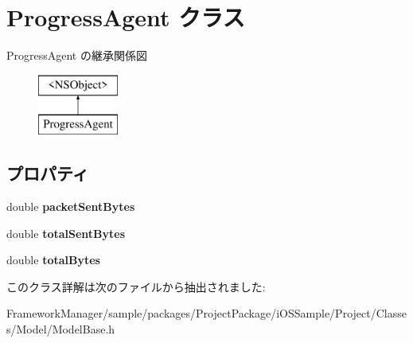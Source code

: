 \hypertarget{interface_progress_agent}{}\section{Progress\+Agent クラス}
\label{interface_progress_agent}
Progress\+Agent の継承関係図\begin{figure}[H]
\begin{center}
\leavevmode
\includegraphics[height=2.000000cm]{interface_progress_agent}
\end{center}
\end{figure}
\subsection*{プロパティ}
\begin{DoxyCompactItemize}
\item 
\hypertarget{interface_progress_agent_aab71cb1b5bf9c3f5d4ee54585e00715a}{}double {\bfseries packet\+Sent\+Bytes}\label{interface_progress_agent_aab71cb1b5bf9c3f5d4ee54585e00715a}

\item 
\hypertarget{interface_progress_agent_a2eea1f3defdccee17821b7c6a9feecfc}{}double {\bfseries total\+Sent\+Bytes}\label{interface_progress_agent_a2eea1f3defdccee17821b7c6a9feecfc}

\item 
\hypertarget{interface_progress_agent_ad89322688a52ffab1575228df366ac17}{}double {\bfseries total\+Bytes}\label{interface_progress_agent_ad89322688a52ffab1575228df366ac17}

\end{DoxyCompactItemize}


このクラス詳解は次のファイルから抽出されました\+:\begin{DoxyCompactItemize}
\item 
Framework\+Manager/sample/packages/\+Project\+Package/i\+O\+S\+Sample/\+Project/\+Classes/\+Model/Model\+Base.\+h\end{DoxyCompactItemize}
